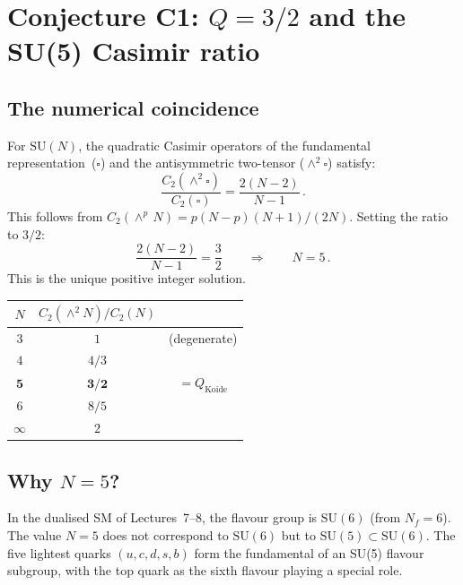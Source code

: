 \documentclass[11pt,a4paper]{article}
\newcommand{\Nf}{N_{\!f}}
\newcommand{\SU}[1]{\mathrm{SU}(#1)}
\newcommand{\fund}{\square}
\newcommand{\antisym}{\wedge^{\!2}}
\theoremstyle{definition}\newtheorem{exercise}{Exercise}[section]
\begin{document}
\section{Conjecture C1: $Q = 3/2$ and the SU(5) Casimir ratio}
\label{sec:casimir}

\subsection{The numerical coincidence}

For $\SU{N}$, the quadratic Casimir operators of the fundamental
representation~($\fund$) and the antisymmetric two-tensor
($\antisym\fund$) satisfy:
\begin{equation}
  \frac{C_2(\antisym\fund)}{C_2(\fund)}
  = \frac{2(N-2)}{N-1}\,.
  \label{eq:casimir-ratio}
\end{equation}
This follows from $C_2(\wedge^p\,N) = p(N-p)(N+1)/(2N)$.
Setting the ratio to $3/2$:
\begin{equation}
  \frac{2(N-2)}{N-1} = \frac{3}{2}
  \qquad\Longrightarrow\qquad N = 5\,.
  \label{eq:Q-N5}
\end{equation}
This is the unique positive integer solution.

\begin{center}\small
\begin{tabular}{@{}ccc@{}}
\toprule
$N$ & $C_2(\wedge^2 N)/C_2(N)$ & \\
\midrule
$3$ & $1$ & (degenerate) \\
$4$ & $4/3$ & \\
$\mathbf{5}$ & $\mathbf{3/2}$ & $= Q_{\text{Koide}}$ \\
$6$ & $8/5$ & \\
$\infty$ & $2$ & \\
\bottomrule
\end{tabular}
\end{center}

\subsection{Why $N = 5$?}

In the dualised SM of Lectures~7--8, the flavour group is
$\SU{6}$ (from $\Nf = 6$).  The value $N = 5$ does not
correspond to $\SU{6}$ but to $\SU{5} \subset \SU{6}$.
The five lightest quarks $(u,c,d,s,b)$ form the fundamental
of an SU(5) flavour subgroup, with the top quark as the sixth
flavour playing a special role.
\end{document}
